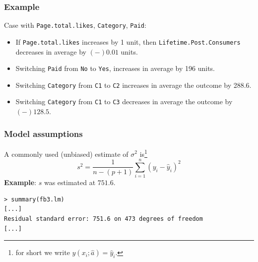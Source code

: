 \begin{frame}
\frametitle{Example}
Case with {\tt Page.total.likes}, {\tt Category}, {\tt Paid}:
\begin{itemize}
\item If {\tt Page.total.likes} increases by 1 unit, then {\tt Lifetime.Post.Consumers} decreases in average by $(-)0.01$ units.
\item Switching {\tt Paid} from {\tt No} to {\tt Yes}, increases in average by 196 units.
\item Switching {\tt Category} from {\tt C1} to {\tt C2} increases in average the outcome by 288.6. 
\item Switching {\tt Category} from {\tt C1} to {\tt C3} decreases in average the outcome by $(-)128.5$. 
\end{itemize}
\end{frame}
\begin{frame}[fragile]
\frametitle{Model assumptions}
A commonly used (unbiased) estimate of $\sigma^2$ is\footnote{for short we write $y(x_i;\hat{a})=\hat{y}_i$.} 
$$
s^2 = \frac{1}{n-(p+1)} \sum_{i=1}^n (y_i-\hat{y}_i)^2
$$
{\bf Example}: $s$ was estimated at $751.6$.\\
\scriptsize
\begin{verbatim}
> summary(fb3.lm)
[...]
Residual standard error: 751.6 on 473 degrees of freedom
[...]
\end{verbatim}
\end{frame}
